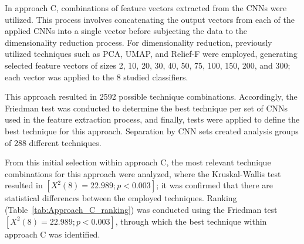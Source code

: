 \documentclass[preprint,12pt]{elsarticle}
\begin{document}
In approach C, combinations of feature vectors extracted from the CNNs were utilized. This process involves concatenating the output vectors from each of the applied CNNs into a single vector before subjecting the data to the dimensionality reduction process. For dimensionality reduction, previously utilized techniques such as PCA, UMAP, and Relief-F were employed, generating selected feature vectors of sizes 2, 10, 20, 30, 40, 50, 75, 100, 150, 200, and 300; each vector was applied to the 8 studied classifiers.

This approach resulted in 2592 possible technique combinations. Accordingly, the Friedman test was conducted to determine the best technique per set of CNNs used in the feature extraction process, and finally, tests were applied to define the best technique for this approach. Separation by CNN sets created analysis groups of 288 different techniques.

From this initial selection within approach C, the most relevant technique combinations for this approach were analyzed, where the Kruskal-Wallis test resulted in $[X^2(8)=22.989; p<0.003]$; it was confirmed that there are statistical differences between the employed techniques. Ranking (Table~\ref{tab:Approach_C_ranking}) was conducted using the Friedman test $[X^2(8)=22.989; p<0.003]$, through which the best technique within approach C was identified.
\end{document}
